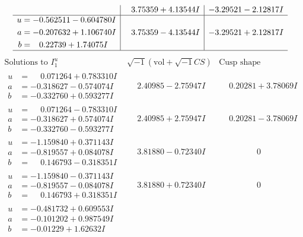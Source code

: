 \documentclass[1p]{elsarticle_modified}
\theoremstyle{definition}
\newcommand{\I}{\sqrt{-1}}
\begin{document}
$$\begin{array}{c|c|c}
 & \phantom{-}3.75359 + 4.13544 I & -3.29521 - 2.12817 I \\ \hline\begin{aligned}
u &= -0.562511 - 0.604780 I \\
a &= -0.207632 + 1.106740 I \\
b &= \phantom{-}0.22739 + 1.74075 I\end{aligned}
 & \phantom{-}3.75359 - 4.13544 I & -3.29521 + 2.12817 I\\
 \hline 
 \end{array}$$\newpage$$\begin{array}{c|c|c}  
\text{Solutions to }I^u_{1}& \I (\text{vol} + \sqrt{-1}CS) & \text{Cusp shape}\\
 \hline 
\begin{aligned}
u &= \phantom{-}0.071264 + 0.783310 I \\
a &= -0.318627 - 0.574074 I \\
b &= -0.332760 + 0.593277 I\end{aligned}
 & \phantom{-}2.40985 - 2.75947 I & \phantom{-}0.20281 + 3.78069 I \\ \hline\begin{aligned}
u &= \phantom{-}0.071264 - 0.783310 I \\
a &= -0.318627 + 0.574074 I \\
b &= -0.332760 - 0.593277 I\end{aligned}
 & \phantom{-}2.40985 + 2.75947 I & \phantom{-}0.20281 - 3.78069 I \\ \hline\begin{aligned}
u &= -1.159840 + 0.371143 I \\
a &= -0.819557 + 0.084078 I \\
b &= \phantom{-}0.146793 - 0.318351 I\end{aligned}
 & \phantom{-}3.81880 - 0.72340 I & \phantom{-0.000000 } 0 \\ \hline\begin{aligned}
u &= -1.159840 - 0.371143 I \\
a &= -0.819557 - 0.084078 I \\
b &= \phantom{-}0.146793 + 0.318351 I\end{aligned}
 & \phantom{-}3.81880 + 0.72340 I & \phantom{-0.000000 } 0 \\ \hline\begin{aligned}
u &= -0.481732 + 0.609553 I \\
a &= -0.101202 + 0.987549 I \\
b &= -0.01229 + 1.62632 I\end{aligned}

\end{array}$$
\end{document}
